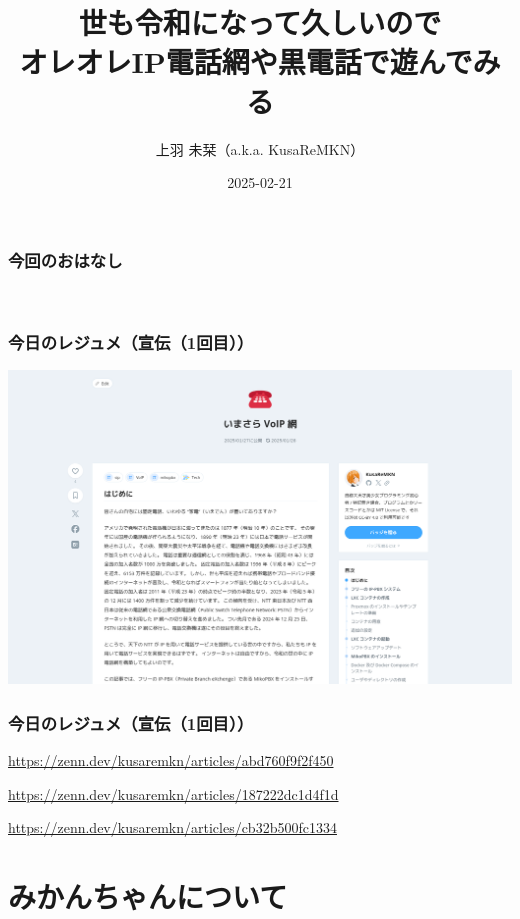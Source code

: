 \documentclass[
  lualatex,
  aspectratio=169,
  14pt
]{beamer}
\title{世も令和になって久しいので\\オレオレIP電話網や黒電話で遊んでみる}
\author{上羽 未栞（a.k.a. KusaReMKN）}
\institute{%
  \url{https://KusaReMKN.com/}\\
  Twitter: \href{https://twitter.com/KusaReMKN}{@KusaReMKN}}
\date{2025-02-21}
\begin{document}
\begin{frame}
  \titlepage
\end{frame}

\begin{frame}
  \frametitle{今回のおはなし}

  ~\\[-.25\baselineskip]
  \tableofcontents
\end{frame}

\begin{frame}
  \frametitle{今日のレジュメ（宣伝（1回目））}

  \includegraphics[width=\linewidth]{./images/imasara.png}
\end{frame}

\begin{frame}
  \frametitle{今日のレジュメ（宣伝（1回目））}

  \begin{description}[labelwidth=\linewidth,itemsep=\zh]
    \item[いまさらVoIP網]
      {\small
      \url{https://zenn.dev/kusaremkn/articles/abd760f9f2f450}}
    \item[VoIPルータを使って黒電話をIP電話機にする]
      {\small
      \url{https://zenn.dev/kusaremkn/articles/187222dc1d4f1d}}
    \item[ICOM VE-TA10を使うためにパケットを書き換えたりする]
      {\small
      \url{https://zenn.dev/kusaremkn/articles/cb32b500fc1334}}
  \end{description}
\end{frame}

\section*{みかんちゃんについて}
\end{document}
